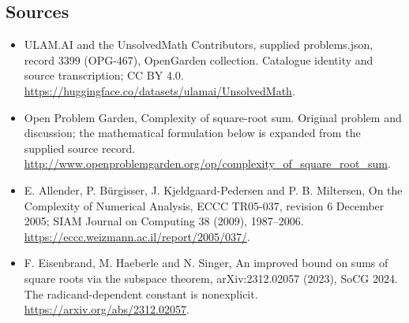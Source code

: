 \documentclass[11pt,a4paper]{article}
\begin{document}
\subsection{Sources}
\begin{itemize}
\item[S1] ULAM.AI and the UnsolvedMath Contributors, supplied problems.json, record 3399 (OPG-467), OpenGarden collection. Catalogue identity and source transcription; CC BY 4.0.
\url{https://huggingface.co/datasets/ulamai/UnsolvedMath}.
\item[S2] Open Problem Garden, Complexity of square-root sum. Original problem and discussion; the mathematical formulation below is expanded from the supplied source record.
\url{http://www.openproblemgarden.org/op/complexity_of_square_root_sum}.
\item[S3] E. Allender, P. Bürgisser, J. Kjeldgaard-Pedersen and P. B. Miltersen, On the Complexity of Numerical Analysis, ECCC TR05-037, revision 6 December 2005; SIAM Journal on Computing 38 (2009), 1987--2006.
\url{https://eccc.weizmann.ac.il/report/2005/037/}.
\item[S4] F. Eisenbrand, M. Haeberle and N. Singer, An improved bound on sums of square roots via the subspace theorem, arXiv:2312.02057 (2023), SoCG 2024. The radicand-dependent constant is nonexplicit.
\url{https://arxiv.org/abs/2312.02057}.
\end{itemize}
\end{document}
